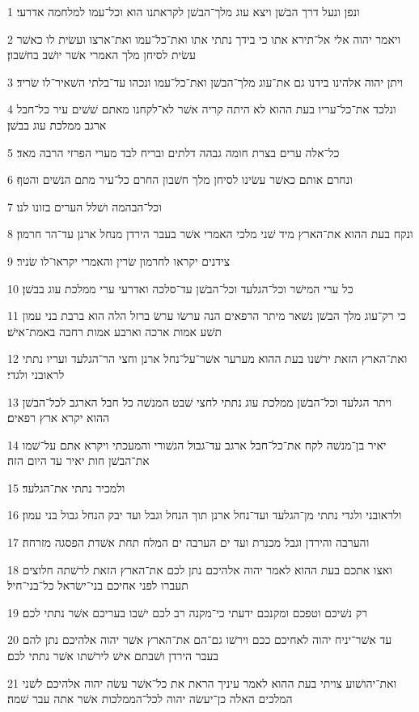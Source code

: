 \par 1 ונפן ונעל דרך הבשׁן ויצא עוג מלך־הבשׁן לקראתנו הוא וכל־עמו למלחמה אדרעי׃
\par 2 ויאמר יהוה אלי אל־תירא אתו כי בידך נתתי אתו ואת־כל־עמו ואת־ארצו ועשׂית לו כאשׁר עשׂית לסיחן מלך האמרי אשׁר יושׁב בחשׁבון׃
\par 3 ויתן יהוה אלהינו בידנו גם את־עוג מלך־הבשׁן ואת־כל־עמו ונכהו עד־בלתי השׁאיר־לו שׂריד׃
\par 4 ונלכד את־כל־עריו בעת ההוא לא היתה קריה אשׁר לא־לקחנו מאתם שׁשׁים עיר כל־חבל ארגב ממלכת עוג בבשׁן׃
\par 5 כל־אלה ערים בצרת חומה גבהה דלתים ובריח לבד מערי הפרזי הרבה מאד׃
\par 6 ונחרם אותם כאשׁר עשׂינו לסיחן מלך חשׁבון החרם כל־עיר מתם הנשׁים והטף׃
\par 7 וכל־הבהמה ושׁלל הערים בזונו לנו׃
\par 8 ונקח בעת ההוא את־הארץ מיד שׁני מלכי האמרי אשׁר בעבר הירדן מנחל ארנן עד־הר חרמון׃
\par 9 צידנים יקראו לחרמון שׂרין והאמרי יקראו־לו שׂניר׃
\par 10 כל ערי המישׁר וכל־הגלעד וכל־הבשׁן עד־סלכה ואדרעי ערי ממלכת עוג בבשׁן׃
\par 11 כי רק־עוג מלך הבשׁן נשׁאר מיתר הרפאים הנה ערשׂו ערשׂ ברזל הלה הוא ברבת בני עמון תשׁע אמות ארכה וארבע אמות רחבה באמת־אישׁ׃
\par 12 ואת־הארץ הזאת ירשׁנו בעת ההוא מערער אשׁר־על־נחל ארנן וחצי הר־הגלעד ועריו נתתי לראובני ולגדי׃
\par 13 ויתר הגלעד וכל־הבשׁן ממלכת עוג נתתי לחצי שׁבט המנשׁה כל חבל הארגב לכל־הבשׁן ההוא יקרא ארץ רפאים׃
\par 14 יאיר בן־מנשׁה לקח את־כל־חבל ארגב עד־גבול הגשׁורי והמעכתי ויקרא אתם על־שׁמו את־הבשׁן חות יאיר עד היום הזה׃
\par 15 ולמכיר נתתי את־הגלעד׃
\par 16 ולראובני ולגדי נתתי מן־הגלעד ועד־נחל ארנן תוך הנחל וגבל ועד יבק הנחל גבול בני עמון׃
\par 17 והערבה והירדן וגבל מכנרת ועד ים הערבה ים המלח תחת אשׁדת הפסגה מזרחה׃
\par 18 ואצו אתכם בעת ההוא לאמר יהוה אלהיכם נתן לכם את־הארץ הזאת לרשׁתה חלוצים תעברו לפני אחיכם בני־ישׂראל כל־בני־חיל׃
\par 19 רק נשׁיכם וטפכם ומקנכם ידעתי כי־מקנה רב לכם ישׁבו בעריכם אשׁר נתתי לכם׃
\par 20 עד אשׁר־יניח יהוה לאחיכם ככם וירשׁו גם־הם את־הארץ אשׁר יהוה אלהיכם נתן להם בעבר הירדן ושׁבתם אישׁ לירשׁתו אשׁר נתתי לכם׃
\par 21 ואת־יהושׁוע צויתי בעת ההוא לאמר עיניך הראת את כל־אשׁר עשׂה יהוה אלהיכם לשׁני המלכים האלה כן־יעשׂה יהוה לכל־הממלכות אשׁר אתה עבר שׁמה׃
